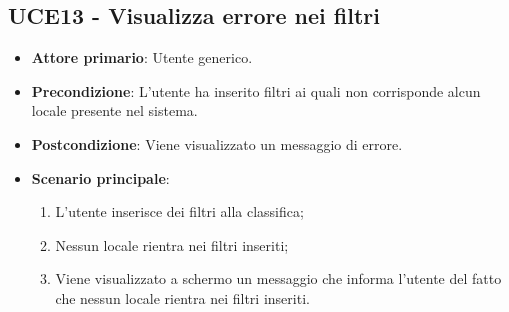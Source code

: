 \subsection{UCE13 - Visualizza errore nei filtri}
\begin{itemize}
    \item \textbf{Attore primario}: Utente generico.
    \item \textbf{Precondizione}: L'utente ha inserito filtri ai quali non corrisponde alcun locale presente nel sistema.
    \item \textbf{Postcondizione}: Viene visualizzato un messaggio di errore.
    \item \textbf{Scenario principale}: 
    \begin{enumerate}
        \item L'utente inserisce dei filtri alla classifica;
        \item Nessun locale rientra nei filtri inseriti;
        \item Viene visualizzato a schermo un messaggio che informa l'utente del fatto che nessun locale rientra nei filtri inseriti.
    \end{enumerate}
\end{itemize}